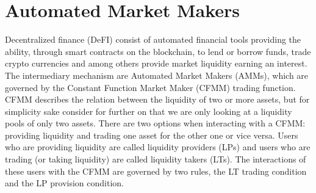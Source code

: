 



\maketitle

\section{Automated Market Makers}
Decentralized finance (DeFI) consist of automated financial tools providing the
ability, through smart contracts on the blockchain, to lend or borrow funds,
trade crypto currencies and among others provide market liquidity earning
an interest. The intermediary mechanism are Automated Market
Makers (AMMs), which are governed by the Constant Function Market Maker
(CFMM) trading function. CFMM describes the relation between the liquidity of
two or more assets, but for simplicity sake consider for further on that we
are only looking at a liquidity pools of only two assets. There are two
options when interacting with a CFMM: providing liquidity and trading one
asset for the other one or vice versa. Users who are providing liquidity are
called liquidity providers (LPs) and users who are trading (or taking
liquidity) are called liquidity takers (LTs). The interactions of these users
with the CFMM are governed by two rules, the LT trading condition and the LP provision
condition.
\newline

